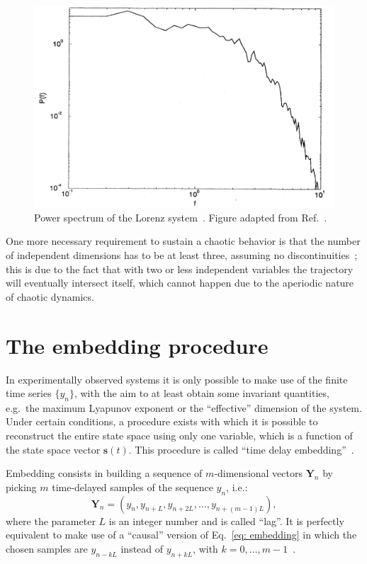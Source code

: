 \begin{figure}[!htbp]
    \centering
    \includegraphics[width=.6\linewidth]{images/lorenz_spectrum.png}
    \caption{
        Power spectrum of the Lorenz system~\cite{lorenz1963deterministic}.
        Figure adapted from Ref.~\cite{ref:abarbanel_fourier_spectra}.
    }\label{fig: lorenz spectrum}
\end{figure}

One more necessary requirement to sustain a chaotic behavior is that
the number of independent dimensions has to be at least three, assuming no discontinuities~\cite{ref:chaos_two_dim_theorem};
this is due to the fact that
with two or less independent variables the trajectory will eventually intersect itself, which
cannot happen due to the aperiodic nature of chaotic dynamics.


\section{The embedding procedure}\label{sec: embedding}

In experimentally observed systems it is only possible to make use of the finite time series $\{y_n\}$,
with the aim to at least obtain some invariant quantities, e.g.\ the maximum Lyapunov exponent or
the ``effective'' dimension of the system. Under certain conditions, a procedure exists with which
it is possible to reconstruct the entire state space using only one variable, which is a
function of the state space vector $\mathbf{s}(t)$. This procedure is called ``time delay embedding''~\cite{ref:packard1980geometry}.

Embedding consists in building a sequence of $m$-dimensional vectors $\mathbf{Y}_n$ by picking
$m$ time-delayed samples of the sequence $y_n$, i.e.:
\begin{equation}
    \label{eq: embedding}
    \mathbf{Y}_n=\left(y_n,y_{n+L},y_{n+2L},\ldots,y_{n+(m-1)L}\right),
\end{equation}
where the parameter $L$ is an integer number and is called ``lag''. It is perfectly equivalent to make use of
a ``causal'' version of Eq.~\ref{eq: embedding} in which the chosen samples are $y_{n-kL}$ instead of
$y_{n+kL}$, with $k=0,\ldots,m-1$~\cite{ref:bradley2015nonlinear}.

